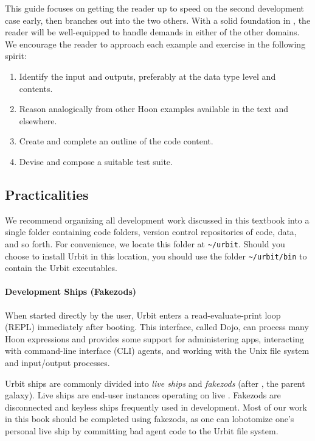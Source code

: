 {{{{This guide focuses on getting the reader up to speed on the second development case early, then branches out into the two others.  With a solid foundation in \gall, the reader will be well-equipped to handle demands in either of the other domains.  We encourage the reader to approach each example and exercise in the following spirit:

\begin{enumerate}
  \item  Identify the input and outputs, preferably at the data type level and contents.
	\item  Reason analogically from other Hoon examples available in the text and elsewhere.
	\item  Create and complete an outline of the code content.
	\item  Devise and compose a suitable test suite.
\end{enumerate}

\subsection{Practicalities}

We recommend organizing all development work discussed in this textbook into a single folder containing code folders, version control repositories of code, data, and so forth.  For convenience, we locate this folder at \texttt{\textasciitilde/urbit}.  Should you choose to install Urbit in this location, you should use the folder \texttt{\textasciitilde/urbit/bin} to contain the Urbit executables.

\paragraph{Development Ships (Fakezods)}

When started directly by the user, Urbit enters a read-evaluate-print loop (REPL) immediately after booting.  This interface, called Dojo, can process many Hoon expressions and provides some support for administering apps, interacting with command-line interface (CLI) agents, and working with the Unix file system and input/output processes.

Urbit ships are commonly divided into \emph{live ships} and \emph{fakezods} (after \zod, the parent galaxy).  Live ships are end-user instances operating on live \ames.  Fakezods are disconnected and keyless ships frequently used in development.  Most of our work in this book should be completed using fakezods, as one can lobotomize one's personal live ship by committing bad agent code to the Urbit file system.

}}}}
